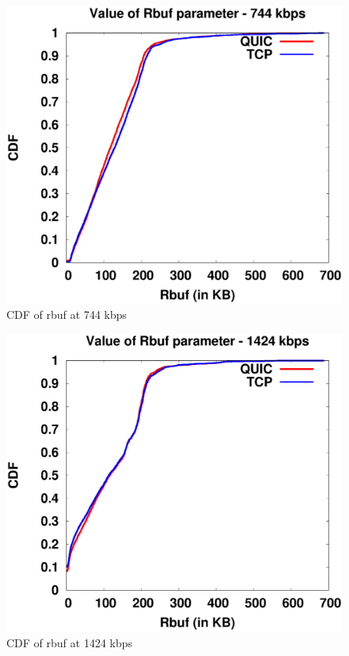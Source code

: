 \begin{figure}[!ht]
    \centering
    \includegraphics[width=0.9\linewidth]{img/CDF/plot_rbuf_761856}
    \caption{CDF of rbuf at 744 kbps}
    \label{fig:rbuf761856}
\end{figure}
\begin{figure}[!ht]
    \centering
    \includegraphics[width=0.9\linewidth]{img/CDF/plot_rbuf_1458176}
    \caption{CDF of rbuf at 1424 kbps}
    \label{fig:rbuf761}
\end{figure}



